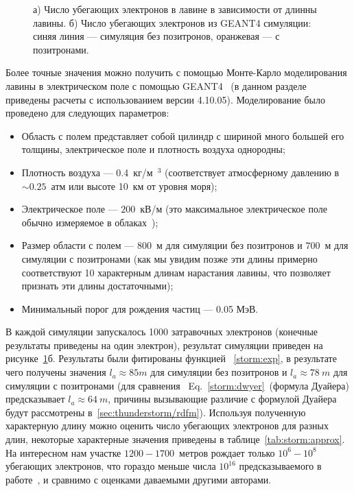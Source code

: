 \begin{figure}[t]
    \begin{center}
        \begin{minipage}[h]{0.49\linewidth}
        \end{minipage}
        \hfill
        \begin{minipage}[h]{0.49\linewidth}
        \end{minipage}
        \caption{  а) Число убегающих электронов в лавине в зависимости от длинны лавины. б) Число убегающих электронов из GEANT4 симуляции: синяя линия --- симуляция без позитронов, оранжевая --- с позитронами.}
    \end{center}
    \label{storm:number_runway}
\end{figure}
Более точные значения можно получить с помощью Монте-Карло моделирования лавины в электрическом поле с помощью GEANT4~\cite{Geant2003,Geant2006, Geant2016} (в данном разделе приведены расчеты с использованием версии 4.10.05).
Моделирование было проведено для следующих параметров: 
\begin{itemize}
    \item Область с полем представляет собой  цилиндр с шириной много большей его толщины, электрическое поле и плотность воздуха однородны;
    \item Плотность воздуха --- 0.4~кг/м~$^3$ (соответствует атмосферному давлению в  $\sim 0.25$~атм или высоте 10~км от уровня моря);
    \item Электрическое поле --- $200$~кВ/м (это максимальное электрическое поле обычно измеряемое в облаках~\cite{rakov_uman});
    \item Размер области с полем --- $800$~м для симуляции без позитронов и $700$~м для симуляции с позитронами (как мы увидим позже эти длины примерно соответствуют 10 характерным длинам нарастания лавины, что позволяет признать эти длины достаточными);
    \item Минимальный порог для рождения частиц --- 0.05 МэВ.
\end{itemize}
В каждой симуляции запускалось 1000 затравочных электронов (конечные результаты приведены на один электрон), результат симуляции приведен на рисунке~\ref{storm:number_runway}б. Результаты были фитированы функцией ~\ref{storm:exp}, в результате чего получены значения  $l_a \approx 85 m$ для симуляции без позитронов и $l_a \approx 78~m$ для симуляции с позитронами (для сравнения ~Eq.~\ref{storm:dwyer}~(формула Дуайера) предсказывает $l_a \approx 64~m$, причины вызывающие различие с формулой Дуайера будут рассмотрены в~\ref{sec:thunderstorm/rdfm}). Используя полученную характерную длину можно оценить число убегающих электронов для разных длин, некоторые характерные значения приведены в таблице~\ref{tab:storm:approx}. На интересном нам участке $1200 - 1700$~метров рождает только $10^6-10^8$ убегающих электронов, что гораздо меньше числа $10^{16}$ предсказываемого в работе~\cite{Oreshkin_2018}, и сравнимо с оценками даваемыми другими авторами.
